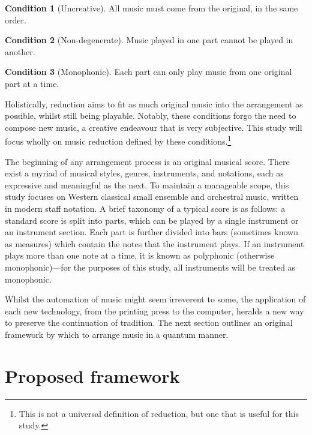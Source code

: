 \documentclass[12pt]{article}
\theoremstyle{definition}
\newtheorem{condition}{Condition}
\begin{document}
\begin{condition}[Uncreative]
    All music must come from the original, in the same order.
    \label{con:uncreative}
\end{condition}
\begin{condition}[Non-degenerate]
    Music played in one part cannot be played in another.
    \label{con:non-degenerate}
\end{condition}
\begin{condition}[Monophonic]
    Each part can only play music from one original part at a time.
    \label{con:monophonic}
\end{condition}

Holistically, reduction aims to fit as much original music into the arrangement as possible, whilst still being playable. Notably, these conditions forgo the need to compose new music, a creative endeavour that is very subjective. This study will focus wholly on music reduction defined by these conditions.\footnote{This is not a universal definition of reduction, but one that is useful for this study.}

The beginning of any arrangement process is an original musical score. There exist a myriad of musical styles, genres, instruments, and notations, each as expressive and meaningful as the next. To maintain a manageable scope, this study focuses on Western classical small ensemble and orchestral music, written in modern staff notation. A brief taxonomy of a typical score is as follows: a standard score is split into parts, which can be played by a single instrument or an instrument section. Each part is further divided into bars (sometimes known as measures) which contain the notes that the instrument plays. If an instrument plays more than one note at a time, it is known as polyphonic (otherwise monophonic)---for the purposes of this study, all instruments will be treated as monophonic.

Whilst the automation of music might seem irreverent to some, the application of each new technology, from the printing press to the computer, heralds a new way to preserve the continuation of tradition. The next section outlines an original framework by which to arrange music in a quantum manner.

\section{Proposed framework}
\end{document}
